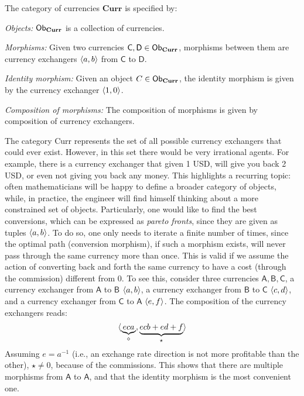 \begin{definition}
    The category of currencies $\mathbf{Curr}$ is specified by:
    \begin{compactenum}
        \item \emph{Objects:} $\operatorname{\mathsf{Ob}}_\mathbf{Curr}$ is a collection of currencies.
        \item \emph{Morphisms:} Given two currencies $\mathsf{C},\mathsf{D}\in \operatorname{\mathsf{Ob}}_{\mathbf{Curr}}$, morphisms between them are currency exchangers $\langle a,b\rangle$ from $\mathsf{C}$ to $\mathsf{D}$. 
        \item \emph{Identity morphism:} Given an object $C\in \operatorname{\mathsf{Ob}}_\mathbf{Curr}$, the identity morphism is given by the currency exchanger $\langle1,0\rangle$.
        \item \emph{Composition of morphisms:} The composition of morphisms is given by composition of currency exchangers.
    \end{compactenum}
\end{definition}

The category Curr represents the set of all possible currency exchangers that could
ever exist. However, in this set there would be very irrational agents. For example, there is a currency exchanger that given 1 USD, will give you back 2 USD, or even not giving you back any money. This highlights a recurring topic: often mathematicians will be happy to define a broader category of objects, while, in practice, the engineer will find himself thinking about a more constrained set of objects. Particularly, one would like to find the best conversions, which can be expressed as \emph{pareto fronts}, since they are given as tuples $\langle a,b\rangle$. To do so, one only needs to iterate a finite number of times, since the optimal path (conversion morphism), if such a morphism exists, will never pass through the same currency more than once. This is valid if we assume the action of converting back and forth the same currency to have a cost (through the commission) different from 0. To see this, consider three currencies $\mathsf{A,B,C}$, a currency exchanger from $\mathsf{A}$ to $\mathsf{B}$  $\langle a,b\rangle$, a currency exchanger from $\mathsf{B}$ to $\mathsf{C}$ 
$\langle c,d\rangle$, and a currency exchanger from $\mathsf{C}$ to $\mathsf{A}$ $\langle e,f\rangle$. The composition of the currency exchangers reads:
\begin{equation}
\langle\underbrace{eca}_{\diamond}, \underbrace{ecb+ed+f}_{\star}\rangle
\end{equation}
Assuming $e=a^{-1}$ (i.e., an exchange rate direction is not more profitable than the other), $\star\neq 0$, because of the commissions. This shows that there are multiple morphisms from $\mathsf{A}$ to $\mathsf{A}$, and that the identity morphism is the most convenient one.






